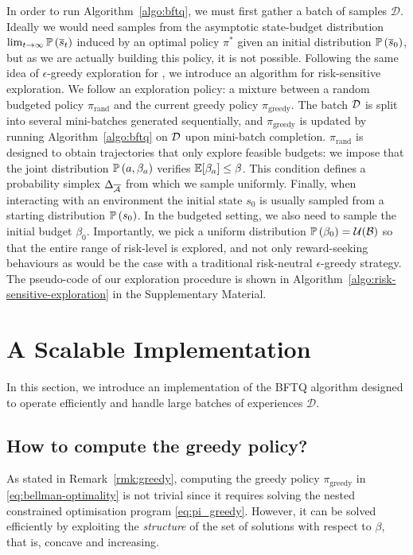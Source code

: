 \documentclass{article}
\begin{document}
\label{sec:exploration}

In order to run Algorithm~\ref{algo:bftq}, we must first gather a batch of samples $\mathcal{D}$. Ideally we would need samples from the asymptotic state-budget distribution $\lim_{t\rightarrow\infty}\mathbb{P}\left(\overline{s}_t\right)$ induced by an optimal policy $\pi^*$ given an initial distribution $\mathbb{P}\left(\overline{s}_0\right)$, but as we are actually building this policy, it is not possible. Following the same idea of $\epsilon$-greedy exploration for \FTQ \citep{Ernst2005,Riedmiller2005}, we introduce an algorithm for risk-sensitive exploration. We follow an exploration policy: a mixture between a random budgeted policy $\pi_\text{rand}$ and the current greedy policy $\pi_\text{greedy}$. The batch $\mathcal{D}$ is split into several mini-batches generated sequentially, and $\pi_\text{greedy}$ is updated by running Algorithm~\ref{algo:bftq} on $\mathcal{D}$ upon mini-batch completion. $\pi_\text{rand}$ is designed to obtain trajectories that only explore feasible budgets: we impose that the joint distribution $\mathbb{P}\left(a, \beta_a\right)$ verifies $\operatorname*{\mathbb{E}}[\beta_a]\leq\beta$. This condition defines a probability simplex $\Delta_{\overline{\mathcal{A}}}$ from which we sample uniformly. Finally, when interacting with an environment the initial state $s_0$ is usually sampled from a starting distribution $\mathbb{P}\left(s_0\right)$. In the budgeted setting, we also need to sample the initial budget $\beta_0$. Importantly, we pick a uniform distribution $\mathbb{P}\left(\beta_0\right) = \mathcal{U}(\mathcal{B})$ so that the entire range of risk-level is explored, and not only reward-seeking behaviours as would be the case with a traditional risk-neutral $\epsilon$-greedy strategy. The pseudo-code of our exploration procedure is shown in Algorithm~\ref{algo:risk-sensitive-exploration} in the Supplementary Material.

\section{A Scalable Implementation}

\label{sec:scalable-bftq}
In this section, we introduce an implementation of the BFTQ algorithm designed to operate efficiently and handle large batches of experiences $\mathcal{D}$.

\subsection{How to compute the greedy policy?}

As stated in Remark~\ref{rmk:greedy}, computing the greedy policy $\pi_\text{greedy}$ in \eqref{eq:bellman-optimality} is not trivial since it requires solving the nested constrained optimisation program \eqref{eq:pi_greedy}.
However, it can be solved efficiently by exploiting the \emph{structure} of the set of solutions with respect to $\beta$, that is, concave and increasing. 
\end{document}
